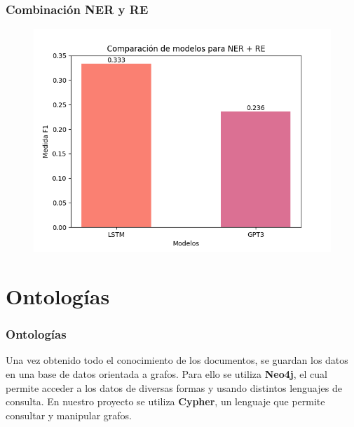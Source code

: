 \documentclass[
11pt, %
%
aspectratio=169, %
]{beamer}
\begin{document}
	\begin{frame}
		\frametitle{Combinaci\'on NER y RE}
				
		\begin{figure}[h!]
		\centering
		\includegraphics[scale=0.5]{../images/NER_RE_bar}
	\end{figure} 	
			
		
	\end{frame}
	
	\section{Ontolog\'ias}
	\begin{frame}
		\frametitle{Ontolog\'ias}
		
		Una vez obtenido todo el conocimiento de los documentos, se guardan los datos en una base de datos orientada a grafos. 	
		Para ello se utiliza \textbf{Neo4j}, el cual permite acceder a los datos de diversas formas y usando distintos lenguajes de consulta. En nuestro proyecto se utiliza \textbf{Cypher}, un lenguaje que permite consultar y manipular grafos.
		
	\end{frame}
	
\end{document}
